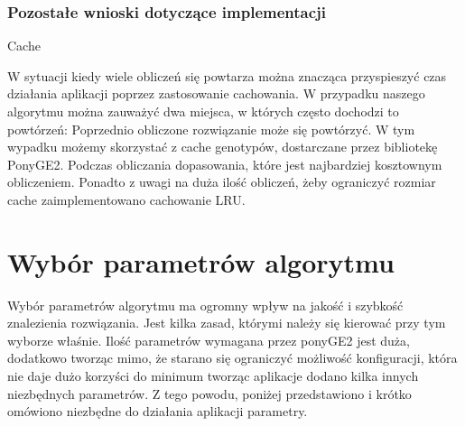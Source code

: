 \subsubsection{Pozostałe wnioski dotyczące implementacji}
Cache

W sytuacji kiedy wiele obliczeń się powtarza można znacząca przyspieszyć czas działania aplikacji poprzez zastosowanie cachowania. W przypadku naszego algorytmu można zauważyć dwa miejsca, w których często dochodzi to powtórzeń:
Poprzednio obliczone rozwiązanie może się powtórzyć. W tym wypadku możemy skorzystać z cache genotypów, dostarczane przez bibliotekę PonyGE2.
Podczas obliczania dopasowania, które jest najbardziej kosztownym obliczeniem. Ponadto z uwagi na duża ilość obliczeń, żeby ograniczyć rozmiar cache zaimplementowano cachowanie LRU.
\section{Wybór parametrów algorytmu}
Wybór parametrów algorytmu ma ogromny wpływ na jakość i szybkość znalezienia rozwiązania. Jest kilka zasad, którymi należy się kierować przy tym wyborze właśnie. Ilość parametrów wymagana przez ponyGE2 jest duża, dodatkowo tworząc mimo, że starano się ograniczyć możliwość konfiguracji, która nie daje dużo korzyści do minimum tworząc aplikacje dodano kilka innych niezbędnych parametrów. Z tego powodu, poniżej przedstawiono i krótko omówiono niezbędne do działania aplikacji parametry.

